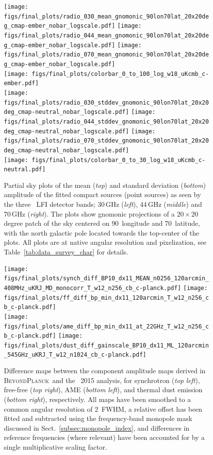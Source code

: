 \documentclass[twocolumn]{aa}
\newcommand{\BP}{\textsc{BeyondPlanck}}
\begin{document}
\begin{figure}
  \center	
  \texttt{[image: figs/final\_plots/radio\_030\_mean\_gnomonic\_90lon70lat\_20x20deg\_cmap-ember\_nobar\_logscale.pdf]}
  \texttt{[image: figs/final\_plots/radio\_044\_mean\_gnomonic\_90lon70lat\_20x20deg\_cmap-ember\_nobar\_logscale.pdf]}
  \texttt{[image: figs/final\_plots/radio\_070\_mean\_gnomonic\_90lon70lat\_20x20deg\_cmap-ember\_nobar\_logscale.pdf]}\\
  \texttt{[image: figs/final\_plots/colorbar\_0\_to\_100\_log\_w18\_uKcmb\_c-ember.pdf]}\vspace{0.3cm}\\
  \texttt{[image: figs/final\_plots/radio\_030\_stddev\_gnomonic\_90lon70lat\_20x20deg\_cmap-neutral\_nobar\_logscale.pdf]}
  \texttt{[image: figs/final\_plots/radio\_044\_stddev\_gnomonic\_90lon70lat\_20x20deg\_cmap-neutral\_nobar\_logscale.pdf]}
  \texttt{[image: figs/final\_plots/radio\_070\_stddev\_gnomonic\_90lon70lat\_20x20deg\_cmap-neutral\_nobar\_logscale.pdf]}\\
  \texttt{[image: figs/final\_plots/colorbar\_0\_to\_30\_log\_w18\_uKcmb\_c-neutral.pdf]}

  \caption{Partial sky plots of the mean (\emph{top}) and
    standard deviation (\emph{bottom}) amplitude of the
    fitted compact sources (point sources) as seen by
    the three \Planck\ LFI detector bands; 30\,GHz (\emph{left}),
    44\,GHz (\emph{middle}) and 70\,GHz (\emph{right}).
    The plots show gnomonic projections of a $20\times 20$
    degree patch of the sky centered on 90\deg\ longitude and
    70\deg\ latitude, with the north galactic pole located towards
    the top-center of the plots. All plots are at native angular
    resolution and pixelization, see Table~\ref{tab:data_survey_char}
    for details. }
  \label{fig:BP_radio}
\end{figure}

\begin{figure}
  \center	
  \texttt{[image: figs/final\_plots/synch\_diff\_BP10\_dx11\_MEAN\_n0256\_120arcmin\_408MHz\_uKRJ\_MD\_monocorr\_T\_w12\_n256\_cb\_c-planck.pdf]}
  \texttt{[image: figs/final\_plots/ff\_diff\_bp\_min\_dx11\_120arcmin\_T\_w12\_n256\_cb\_c-planck.pdf]} \\
  \texttt{[image: figs/final\_plots/ame\_diff\_bp\_min\_dx11\_at\_22GHz\_T\_w12\_n256\_cb\_c-planck.pdf]} 
  \texttt{[image: figs/final\_plots/dust\_diff\_gainscale\_BP10\_dx11\_ML\_120arcmin\_545GHz\_uKRJ\_T\_w12\_n1024\_cb\_c-planck.pdf]}  \\
  \caption{ Difference maps between the component amplitude maps
    derived in \BP\ and the \Planck\ 2015 analysis, for synchrotron
    (\emph{top left}), free-free (\emph{top right}), AME (\emph{bottom
      left}), and thermal dust emission (\emph{bottom right}),
    respectively. All maps have been smoothed to a common angular
    resolution of 2\deg\ FWHM, a relative offset has been fitted and subtracted
    using the frequency-band monopole mask discussed in
    Sect.~\ref{subsec:monopole_index}, and differences in reference
    frequencies (where relevant) have been accounted for by a single
    multiplicative scaling factor.  }
  \label{fig:diff_maps}
\end{figure}
\end{document}
